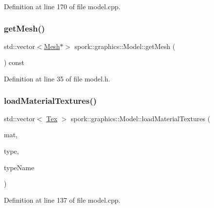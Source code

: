 Definition at line 170 of file model.\+cpp.

\mbox{\label{classspork_1_1graphics_1_1_model_a8944e099bc13464e73e566d13b834216}} 
\subsubsection{\texorpdfstring{get\+Mesh()}{getMesh()}}
{\footnotesize\ttfamily std\+::vector$<$\hyperlink{classspork_1_1graphics_1_1_mesh}{Mesh}$\ast$$>$ spork\+::graphics\+::\+Model\+::get\+Mesh (\begin{DoxyParamCaption}{ }\end{DoxyParamCaption}) const\hspace{0.3cm}{\ttfamily [inline]}}



Definition at line 35 of file model.\+h.

\mbox{\label{classspork_1_1graphics_1_1_model_a728a70e87b9a8cc83f746787219fb373}} 
\subsubsection{\texorpdfstring{load\+Material\+Textures()}{loadMaterialTextures()}}
{\footnotesize\ttfamily std\+::vector$<$ \hyperlink{structspork_1_1graphics_1_1_tex}{Tex} $>$ spork\+::graphics\+::\+Model\+::load\+Material\+Textures (\begin{DoxyParamCaption}\item[{ai\+Material $\ast$}]{mat,  }\item[{ai\+Texture\+Type}]{type,  }\item[{\hyperlink{my_string_8h_afbeda3fd1bdc8c37d01bdf9f5c8274ff}{String}}]{type\+Name }\end{DoxyParamCaption})}



Definition at line 137 of file model.\+cpp.

\mbox{\label{classspork_1_1graphics_1_1_model_a022a882076f86af30528a578058be5fa}} 
